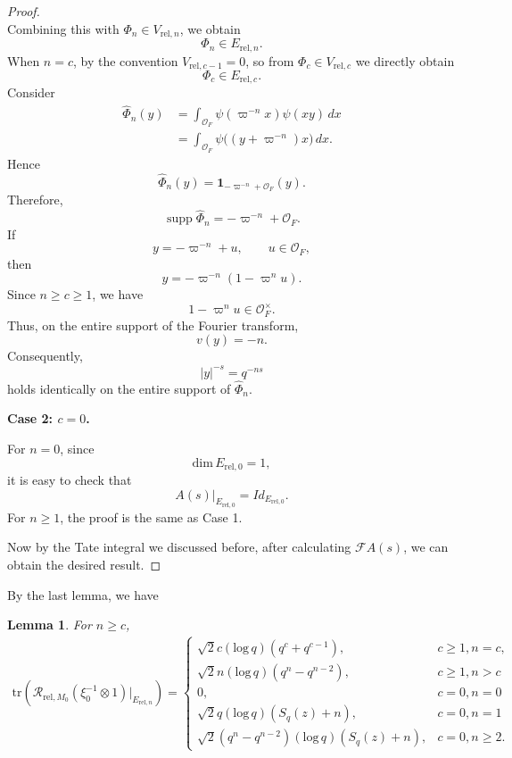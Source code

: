 \documentclass[11pt]{amsart}
\newtheorem {lemma}      [theorem]    {Lemma}
\renewcommand{\rm}{\mathrm}
\theoremstyle{definition}
\numberwithin{equation}{section}
\begin{document}
\begin{proof}
\[		\]
		Combining this with \(\Phi_n \in V_{\rm{rel},n}\), we obtain
		\[
		\Phi_n \in E_{\rm{rel},n}.
		\]
		When \(n = c\), by the convention \(V_{\rm{rel},c-1} = 0\), so from \(\Phi_c \in V_{\rm{rel},c}\) we directly obtain
		\[
		\Phi_c \in E_{\rm{rel},c}.
		\]Consider
		\begin{align*}
			\hat{\Phi}_n(y) &= \int_{\mathcal{O}_F} \psi(\varpi^{-n}x)\psi(xy)\,dx \\
			&= \int_{\mathcal{O}_F} \psi\big((y + \varpi^{-n})x\big)\,dx.
		\end{align*}
		Hence
		\[
		\hat{\Phi}_n(y) = \mathbf{1}_{-\varpi^{-n}+\mathcal{O}_F}(y).
		\]
		Therefore,
		\[
		\operatorname{supp} \hat{\Phi}_n = -\varpi^{-n} + \mathcal{O}_F.
		\]
		If
		\[
		y = -\varpi^{-n} + u, \qquad u \in \mathcal{O}_F,
		\]
		then
		\[
		y = -\varpi^{-n}(1 - \varpi^n u).
		\]
		Since \(n \geq c \geq 1\), we have
		\[
		1 - \varpi^n u \in \mathcal{O}_F^\times.
		\]
		Thus, on the entire support of the Fourier transform,
		\[
		v(y) = -n.
		\]
		Consequently,
		\[
		|y|^{-s} = q^{-ns}
		\]
		holds identically on the entire support of \(\hat{\Phi}_n\).
		
		
		\textbf{Case 2: \(c=0\).}
		
		For \(n=0\), since \[\rm{dim}\, E_{\rm{rel},0}=1,\] it is easy to check that \[A(s)|_{E_{\rm{rel},0}}=Id_{E_{\rm{rel},0}}.\]
		For \(n\ge1\), the proof is the same as Case 1.
		
		
		Now by the Tate integral we discussed before, after calculating \(\mathcal{F}A(s)\), we can obtain the desired result.
	\end{proof}
	By the last lemma, we have
	\begin{lemma}\label{315}
		For \(n\ge c\),
		\begin{align*}
			\rm{tr}(\mathscr{R}_{\rm{rel},M_0}(\xi_0^{-1}\otimes 1)|_{E_{\rm{rel},n}})=\begin{cases}
				\sqrt{2}c(\rm{log}\,q)(q^c+q^{c-1}),&c\ge1, n=c,\\
				\sqrt{2}n(\rm{log}\,q)(q^n-q^{n-2}),&c\ge1,n>c\\
				0,&c=0,n=0\\
				\sqrt{2}q(\rm{log}\,q)(S_q(z)+n),&c=0,n=1\\
				\sqrt{2}(q^n-q^{n-2})(\rm{log}\,q)(S_q(z)+n),&c=0,n\ge 2.
			\end{cases}
		\end{align*}
	\end{lemma}
\end{document}
